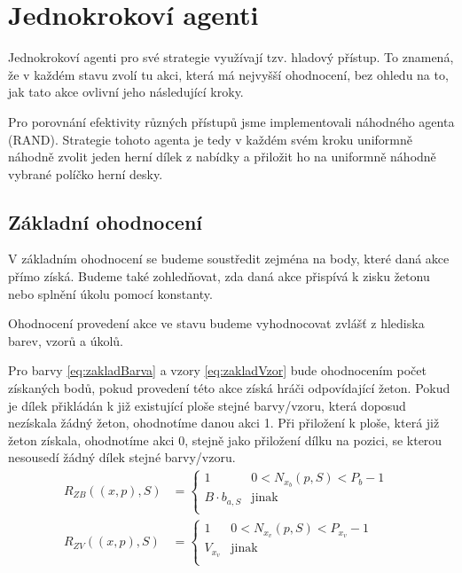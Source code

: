 \section{Jednokrokoví agenti}

Jednokrokoví agenti pro své strategie využívají tzv. hladový přístup. To znamená, že v každém stavu zvolí tu akci, která má nejvyšší ohodnocení, bez ohledu na to, jak tato akce ovlivní jeho následující kroky.

Pro porovnání efektivity různých přístupů jsme implementovali náhodného agenta (RAND). Strategie tohoto agenta je tedy v každém svém kroku uniformně náhodně zvolit jeden herní dílek z nabídky a přiložit ho na uniformně náhodně vybrané políčko herní desky.

\subsection{Základní ohodnocení}

V základním ohodnocení se budeme soustředit zejména na body, které daná akce přímo získá. Budeme také zohledňovat, zda daná akce přispívá k zisku žetonu nebo splnění úkolu pomocí konstanty.

Ohodnocení provedení akce ve stavu budeme vyhodnocovat zvlášť z hlediska barev, vzorů a úkolů. 

Pro barvy \ref{eq:zakladBarva} a vzory \ref{eq:zakladVzor} bude ohodnocením počet získaných bodů, pokud provedení této akce získá hráči odpovídající žeton. Pokud je dílek přikládán k již existující ploše stejné barvy/vzoru, která doposud nezískala žádný žeton, ohodnotíme danou akci 1. Při přiložení k ploše, která již žeton získala, ohodnotíme akci 0, stejně jako přiložení dílku na pozici, se kterou nesousedí žádný dílek stejné barvy/vzoru.
\begin{align}
     R_{ZB}((x,p),S) &= 
    \begin{cases}
        1              &0 < N_{x_b}(p,S) < P_b-1\\
        B\cdot b_{a,S} &\text{jinak}
        \label{eq:zakladBarva}\\
    \end{cases}& \\
    R_{ZV}((x,p),S) &= 
        \begin{cases}
            1           &0 < N_{x_v}(p,S) < P_{x_v}-1\\
            V_{x_v}     &\text{jinak}
            \label{eq:zakladVzor}\\
        \end{cases}&
\end{align}

